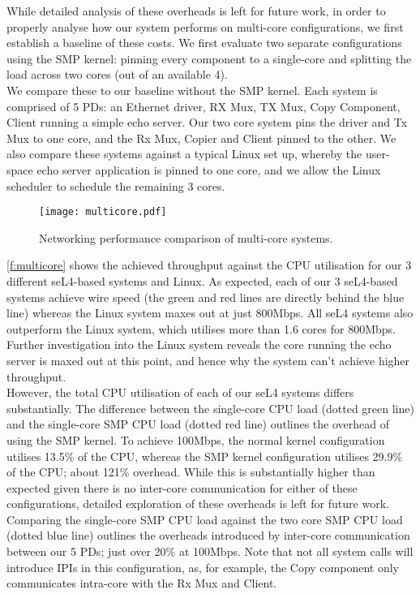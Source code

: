While detailed analysis of these overheads is left for future work, in order to properly
analyse how our system performs on multi-core configurations, we first establish a baseline of these costs. We first evaluate two separate configurations
using the SMP kernel: pinning every component to a single-core and splitting the load across two cores (out of an available 4). \\

We compare these to our baseline without the SMP kernel. Each system is comprised of 5 PDs: an Ethernet driver, RX Mux, 
TX Mux, Copy Component, Client running a simple echo server. Our two core system pins the driver and Tx Mux to one core, and 
the Rx Mux, Copier and Client pinned to the other. We also compare these systems against a typical Linux set up, whereby
the user-space echo server application is pinned to one core, and we allow the Linux scheduler to schedule the remaining 3 cores.\\ 

\begin{figure}[H]
    \centering
    \texttt{[image: multicore.pdf]}
    \caption{Networking performance comparison of multi-core systems.}
    \label{f:multicore}
\end{figure}

\autoref{f:multicore} shows the achieved throughput against the CPU utilisation for our 3 different seL4-based systems and Linux. 
As expected, each of our 3 seL4-based systems achieve wire speed (the green and red lines are directly behind the blue line)
whereas the Linux system maxes out at just 800Mbps. All seL4 systems also outperform the Linux system, which utilises more than
1.6 cores for 800Mbps. Further investigation into the Linux system reveals the core running the echo server is maxed out at 
this point, and hence why the system can't achieve higher throughput. \\

However, the total CPU utilisation of each of our seL4 systems differs substantially. 
The difference between the single-core CPU load (dotted green line) and the single-core SMP CPU load (dotted red line) 
outlines the overhead of using the SMP kernel. To achieve 100Mbps, the normal kernel configuration utilises 13.5\% of the CPU, whereas
the SMP kernel configuration utilises 29.9\% of the CPU; about 121\% overhead. While this is substantially higher than expected given
there is no inter-core communication for either of these configurations, detailed
exploration of these overheads is left for future work. 
Comparing the single-core SMP CPU load against the two core SMP CPU load (dotted blue line) outlines the overheads introduced by
inter-core communication between our 5 PDs; just over 20\% at 100Mbps. Note that not all system calls will introduce IPIs in
this configuration, as, for example, the Copy component only communicates intra-core with the Rx Mux and Client. \\

